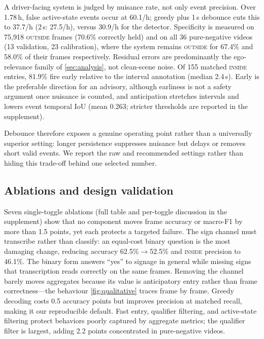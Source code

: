 \documentclass[journal]{IEEEtran}
\begin{document}
A driver-facing system is judged by nuisance rate, not only event precision.  Over 1.78\,h, false active-state events occur at 60.1/h; greedy plus 1\,s debounce cuts this to 37.7/h (2\,s: 27.5/h), versus 30.9/h for the detector.  Specificity is measured on 75{,}918 \textsc{outside} frames (70.6\% correctly held) and on all 36 pure-negative videos (13 validation, 23 calibration), where the system remains \textsc{outside} for 67.4\% and 58.0\% of their frames respectively.  Residual errors are predominantly the ego-relevance family of \cref{sec:analysis}, not clean-scene noise.  Of 155 matched \textsc{inside} entries, 81.9\% fire early relative to the interval annotation (median 2.4\,s).  Early is the preferable direction for an advisory, although earliness is not a safety argument once nuisance is counted, and anticipation stretches intervals and lowers event temporal IoU (mean 0.263; stricter thresholds are reported in the supplement).

Debounce therefore exposes a genuine operating point rather than a universally superior setting: longer persistence suppresses nuisance but delays or removes short valid events.  We report the raw and recommended settings rather than hiding this trade-off behind one selected number.

\subsection{Ablations and design validation}
\label{sec:ablations}

Seven single-toggle ablations (full table and per-toggle discussion in the supplement) show that no component moves frame accuracy or macro-F1 by more than 1.5 points, yet each protects a targeted failure.  The sign channel must transcribe rather than classify: an equal-cost binary question is the most damaging change, reducing accuracy 62.5\%$\to$52.5\% and \textsc{inside} precision to 46.1\%.  The binary form answers ``yes'' to signage in general while missing signs that transcription reads correctly on the same frames.  Removing the channel barely moves aggregates because its value is anticipatory entry rather than frame correctness---the behaviour \cref{fig:qualitative} traces frame by frame.  Greedy decoding costs 0.5 accuracy points but improves precision at matched recall, making it our reproducible default.  Fast entry, qualifier filtering, and active-state filtering protect behaviors poorly captured by aggregate metrics; the qualifier filter is largest, adding 2.2 points concentrated in pure-negative videos.
\end{document}
